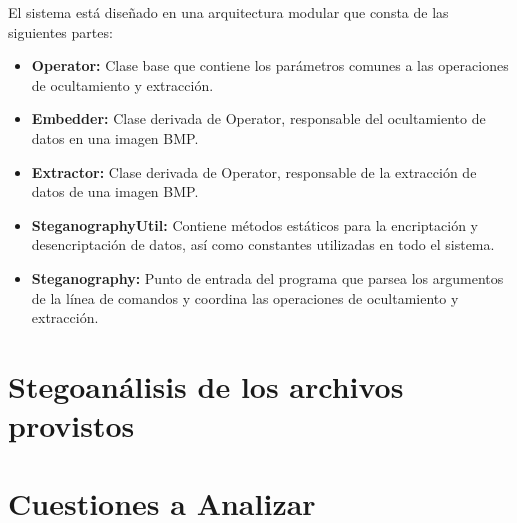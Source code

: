 \documentclass[a4paper,12pt]{article}
\begin{document}
	El sistema está diseñado en una arquitectura modular que consta de las siguientes partes:
	
	\begin{itemize}
		\item \textbf{Operator:} Clase base que contiene los parámetros comunes a las operaciones de ocultamiento y extracción.
		\item \textbf{Embedder:} Clase derivada de Operator, responsable del ocultamiento de datos en una imagen BMP.
		\item \textbf{Extractor:} Clase derivada de Operator, responsable de la extracción de datos de una imagen BMP.
		\item \textbf{SteganographyUtil:} Contiene métodos estáticos para la encriptación y desencriptación de datos, así como constantes utilizadas en todo el sistema.
		\item \textbf{Steganography:} Punto de entrada del programa que parsea los argumentos de la línea de comandos y coordina las operaciones de ocultamiento y extracción.
	\end{itemize}

	\newpage

	\section{Stegoanálisis de los archivos provistos}
	
	
	\newpage
	
	\section{Cuestiones a Analizar}
	
\end{document}
